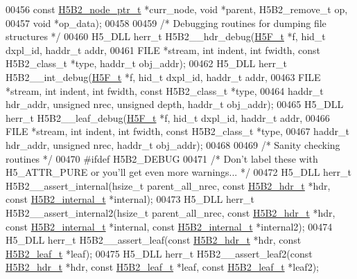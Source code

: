 \begin{DoxyCode}
{{00456     \textcolor{keyword}{const} \hyperlink{struct_h5_b2__node__ptr__t}{H5B2\_node\_ptr\_t} *curr\_node, \textcolor{keywordtype}{void} *parent, H5B2\_remove\_t op,
00457     \textcolor{keywordtype}{void} *op\_data);
00458 
00459 \textcolor{comment}{/* Debugging routines for dumping file structures */}
00460 H5\_DLL herr\_t H5B2\_\_hdr\_debug(\hyperlink{struct_h5_f__t}{H5F\_t} *f, hid\_t dxpl\_id, haddr\_t addr,
00461     FILE *stream, \textcolor{keywordtype}{int} indent, \textcolor{keywordtype}{int} fwidth, \textcolor{keyword}{const} H5B2\_class\_t *type, haddr\_t obj\_addr);
00462 H5\_DLL herr\_t H5B2\_\_int\_debug(\hyperlink{struct_h5_f__t}{H5F\_t} *f, hid\_t dxpl\_id, haddr\_t addr,
00463     FILE *stream, \textcolor{keywordtype}{int} indent, \textcolor{keywordtype}{int} fwidth, \textcolor{keyword}{const} H5B2\_class\_t *type,
00464     haddr\_t hdr\_addr, \textcolor{keywordtype}{unsigned} nrec, \textcolor{keywordtype}{unsigned} depth, haddr\_t obj\_addr);
00465 H5\_DLL herr\_t H5B2\_\_leaf\_debug(\hyperlink{struct_h5_f__t}{H5F\_t} *f, hid\_t dxpl\_id, haddr\_t addr,
00466     FILE *stream, \textcolor{keywordtype}{int} indent, \textcolor{keywordtype}{int} fwidth, \textcolor{keyword}{const} H5B2\_class\_t *type,
00467     haddr\_t hdr\_addr, \textcolor{keywordtype}{unsigned} nrec, haddr\_t obj\_addr);
00468 
00469 \textcolor{comment}{/* Sanity checking routines */}
00470 \textcolor{preprocessor}{#ifdef H5B2\_DEBUG}
00471 \textcolor{comment}{/* Don't label these with H5\_ATTR\_PURE or you'll get even more warnings... */}
00472 H5\_DLL herr\_t H5B2\_\_assert\_internal(hsize\_t parent\_all\_nrec, \textcolor{keyword}{const} \hyperlink{struct_h5_b2__hdr__t}{H5B2\_hdr\_t} *hdr, \textcolor{keyword}{const} 
      \hyperlink{struct_h5_b2__internal__t}{H5B2\_internal\_t} *\textcolor{keyword}{internal});
00473 H5\_DLL herr\_t H5B2\_\_assert\_internal2(hsize\_t parent\_all\_nrec, \textcolor{keyword}{const} \hyperlink{struct_h5_b2__hdr__t}{H5B2\_hdr\_t} *hdr, \textcolor{keyword}{const} 
      \hyperlink{struct_h5_b2__internal__t}{H5B2\_internal\_t} *\textcolor{keyword}{internal}, \textcolor{keyword}{const} \hyperlink{struct_h5_b2__internal__t}{H5B2\_internal\_t} *internal2);
00474 H5\_DLL herr\_t H5B2\_\_assert\_leaf(\textcolor{keyword}{const} \hyperlink{struct_h5_b2__hdr__t}{H5B2\_hdr\_t} *hdr, \textcolor{keyword}{const} 
      \hyperlink{struct_h5_b2__leaf__t}{H5B2\_leaf\_t} *leaf);
00475 H5\_DLL herr\_t H5B2\_\_assert\_leaf2(\textcolor{keyword}{const} \hyperlink{struct_h5_b2__hdr__t}{H5B2\_hdr\_t} *hdr, \textcolor{keyword}{const} 
      \hyperlink{struct_h5_b2__leaf__t}{H5B2\_leaf\_t} *leaf, \textcolor{keyword}{const} \hyperlink{struct_h5_b2__leaf__t}{H5B2\_leaf\_t} *leaf2);
}}
\end{DoxyCode}
